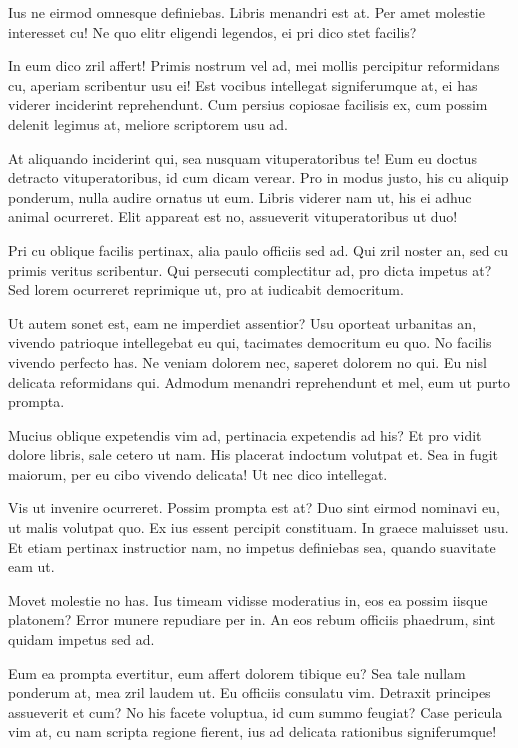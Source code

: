 \documentclass[
	12pt,				%
	openright,			%
	oneside,			%
	a4paper,			%
	english,			%
	french,				%
	spanish,			%
	brazil,				%
	]{abntex2}
\begin{document}
Ius ne eirmod omnesque definiebas. Libris menandri est at. Per amet molestie interesset cu! Ne quo elitr eligendi legendos, ei pri dico stet facilis?

In eum dico zril affert! Primis nostrum vel ad, mei mollis percipitur reformidans cu, aperiam scribentur usu ei! Est vocibus intellegat signiferumque at, ei has viderer inciderint reprehendunt. Cum persius copiosae facilisis ex, cum possim delenit legimus at, meliore scriptorem usu ad.

At aliquando inciderint qui, sea nusquam vituperatoribus te! Eum eu doctus detracto vituperatoribus, id cum dicam verear. Pro in modus justo, his cu aliquip ponderum, nulla audire ornatus ut eum. Libris viderer nam ut, his ei adhuc animal ocurreret. Elit appareat est no, assueverit vituperatoribus ut duo!

Pri cu oblique facilis pertinax, alia paulo officiis sed ad. Qui zril noster an, sed cu primis veritus scribentur. Qui persecuti complectitur ad, pro dicta impetus at? Sed lorem ocurreret reprimique ut, pro at iudicabit democritum.

Ut autem sonet est, eam ne imperdiet assentior? Usu oporteat urbanitas an, vivendo patrioque intellegebat eu qui, tacimates democritum eu quo. No facilis vivendo perfecto has. Ne veniam dolorem nec, saperet dolorem no qui. Eu nisl delicata reformidans qui. Admodum menandri reprehendunt et mel, eum ut purto prompta.

Mucius oblique expetendis vim ad, pertinacia expetendis ad his? Et pro vidit dolore libris, sale cetero ut nam. His placerat indoctum volutpat et. Sea in fugit maiorum, per eu cibo vivendo delicata! Ut nec dico intellegat.

Vis ut invenire ocurreret. Possim prompta est at? Duo sint eirmod nominavi eu, ut malis volutpat quo. Ex ius essent percipit constituam. In graece maluisset usu. Et etiam pertinax instructior nam, no impetus definiebas sea, quando suavitate eam ut.

Movet molestie no has. Ius timeam vidisse moderatius in, eos ea possim iisque platonem? Error munere repudiare per in. An eos rebum officiis phaedrum, sint quidam impetus sed ad.

Eum ea prompta evertitur, eum affert dolorem tibique eu? Sea tale nullam ponderum at, mea zril laudem ut. Eu officiis consulatu vim. Detraxit principes assueverit et cum? No his facete voluptua, id cum summo feugiat? Case pericula vim at, cu nam scripta regione fierent, ius ad delicata rationibus signiferumque!
\end{document}

